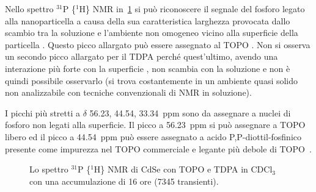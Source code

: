 Nello spettro $^{31}$P \{$^1$H\} NMR in~\ref{fig:CdSe-TOPO_TDPA-P_NMR} si può riconoscere il segnale del fosforo legato alla nanoparticella a causa della sua caratteristica larghezza provocata {
dallo scambio tra la soluzione e l'ambiente non omogeneo vicino alla superficie della particella \cite{lig-CdSe-P}. Questo picco allargato può essere assegnato al TOPO \cite{lig-CdSe-P}. Non si osserva un secondo picco allargato per il TDPA perché quest'ultimo, avendo una interazione più forte con la superficie \cite{lig-CdSe-P}, non scambia con la soluzione e non è quindi possibile osservarlo (si trova costantemente in un ambiente quasi solido non analizzabile con tecniche convenzionali di NMR in soluzione).}

I picchi più stretti a $\delta$ 56.23, 44.54, 33.34~ppm sono da assegnare a nuclei di fosforo non legati alla superficie. Il picco a 56.23~ppm si può assegnare a TOPO libero ed il picco a 44.54~ppm può essere assegnato a acido P,P-diottil-fosfinico presente come impurezza nel TOPO commerciale e legante più debole di TOPO~\cite{lig-CdSe-P}.
\begin{figure}
\caption{\footnotesize{Lo spettro $^{31}$P \{$^1$H\} NMR di CdSe con TOPO e TDPA in CDCl$_3$ con una accumulazione di 16 ore (7345 transienti).}
\label{fig:CdSe-TOPO_TDPA-P_NMR}}
\end{figure}

